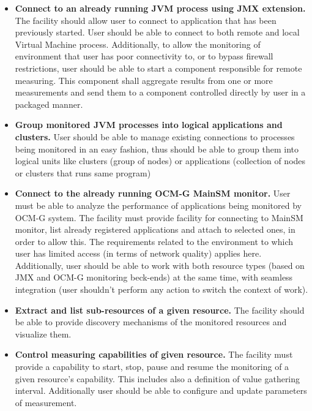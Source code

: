 \begin{itemize}

\item {\bf Connect to an already running JVM process using JMX extension.} 
The facility should allow user to connect to application that has been previously started. User should be able to connect to both remote and local Virtual Machine process. Additionally, to allow the monitoring of environment that user has poor connectivity to, or to bypass firewall restrictions, user should be able to start a component responsible for remote measuring. This component shall aggregate results from one or more measurements and send them to a component controlled directly by user in a packaged manner.

\item {\bf Group monitored JVM processes into logical applications and clusters.}
User should be able to manage existing connections to processes being monitored in an easy fashion, thus should be able to group them into logical units like clusters (group of nodes) or applications (collection of nodes or clusters that runs same program)

\item {\bf Connect to the already running OCM-G MainSM monitor.}
User must be able to analyze the performance of applications being monitored by OCM-G system. The facility must provide facility for connecting to MainSM monitor, list already registered applications and attach to selected ones, in order to allow this. The requirements related to the environment to which user has limited access (in terms of network quality) applies here. Additionally, user should be able to work with both resource types (based on JMX and OCM-G monitoring beck-ends) at the same time, with seamless integration (user shouldn't perform any action to switch the context of work).

\item {\bf Extract and list sub-resources of a given resource.}
The facility should be able to provide discovery mechanisms of the monitored resources and visualize them.

\item {\bf Control measuring capabilities of given resource.}
The facility must provide a capability to start, stop, pause and resume the monitoring of a given resource's capability. This includes also a definition of value gathering interval. Additionally user should be able to configure and update parameters of measurement. 


\end{itemize}
